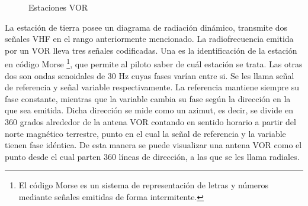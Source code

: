 \begin{figure}[!b]
 \centering
 \caption{Estaciones VOR }
\end{figure}


La estaci\'on de tierra posee un diagrama de radiaci\'on din\'amico, transmite dos se\~nales VHF en el rango anteriormente mencionado. La radiofrecuencia emitida por un VOR lleva tres se\~nales codificadas. Una es la identificaci\'on de la estaci\'on en c\'odigo Morse \footnote{El c\'odigo Morse es un sistema de representaci\'on de letras y n\'umeros mediante se\~nales emitidas de forma intermitente.}, que permite al piloto saber de cu\'al estaci\'on se trata. Las otras dos son ondas senoidales de 30 Hz cuyas fases var\'ian entre si. Se les llama se\~nal de referencia y se\~nal variable respectivamente. La referencia mantiene siempre su fase constante, mientras que la variable cambia su fase seg\'un la direcci\'on en la que sea emitida. Dicha direcci\'on se mide como un azimut, es decir, se divide en 360 grados alrededor de la antena VOR contando en sentido horario a partir del norte magn\'etico terrestre, punto en el cual la se\~nal de referencia y la variable tienen fase id\'entica. De esta manera se puede visualizar una antena VOR como el punto desde el cual parten 360 l\'ineas de direcci\'on, a las que se les llama radiales.


